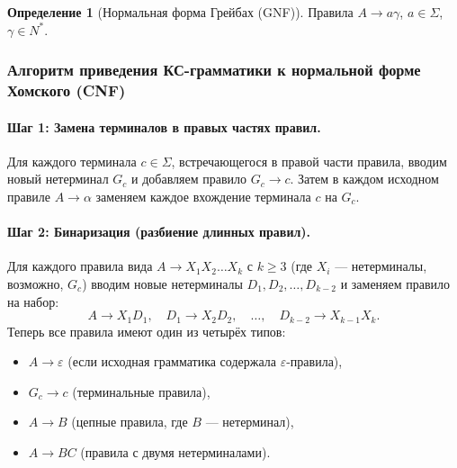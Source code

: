 \documentclass[12pt,a4paper]{article}
\theoremstyle{definition}
\newtheorem{definition}{Определение}[section]
\begin{document}
\begin{definition}[Нормальная форма Грейбах (GNF)]
Правила $A\to a\gamma$, $a\in\Sigma$, $\gamma\in N^*$.
\end{definition}

\subsubsection{Алгоритм приведения КС-грамматики к нормальной форме Хомского (CNF)}

\paragraph{Шаг 1: Замена терминалов в правых частях правил.}
Для каждого терминала $c \in \Sigma$, встречающегося в правой части правила, вводим новый нетерминал $G_c$ и добавляем правило $G_c \to c$. Затем в каждом исходном правиле $A \to \alpha$ заменяем каждое вхождение терминала $c$ на $G_c$.

\paragraph{Шаг 2: Бинаризация (разбиение длинных правил).}
Для каждого правила вида $A \to X_1 X_2 \ldots X_k$ с $k \ge 3$ (где $X_i$ --- нетерминалы, возможно, $G_c$) вводим новые нетерминалы $D_1, D_2, \ldots, D_{k-2}$ и заменяем правило на набор:
\[
A \to X_1 D_1,\quad D_1 \to X_2 D_2,\quad \ldots,\quad D_{k-2} \to X_{k-1} X_k.
\]
Теперь все правила имеют один из четырёх типов:
\begin{itemize}
\item $A \to \varepsilon$ (если исходная грамматика содержала $\varepsilon$-правила),
\item $G_c \to c$ (терминальные правила),
\item $A \to B$ (цепные правила, где $B$ --- нетерминал),
\item $A \to BC$ (правила с двумя нетерминалами).
\end{itemize}
\end{document}
